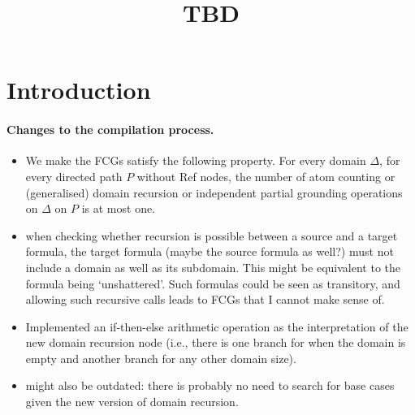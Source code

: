 \documentclass{article}
\title{TBD}
\begin{document}
\maketitle

\begin{abstract}
\end{abstract}

\section{Introduction}


\paragraph{Changes to the compilation process.}
\begin{itemize}
  \item We make the FCGs satisfy the following property. For every domain
        $\Delta$, for every directed path $P$ without Ref nodes, the number of
        atom counting or (generalised) domain recursion or independent partial
        grounding operations on $\Delta$ on $P$ is at most one.
  \item when checking whether recursion is possible between a source and a
        target formula, the target formula (maybe the source formula as well?)
        must not include a domain as well as its subdomain. This might be
        equivalent to the formula being `unshattered'. Such formulas could be
        seen as transitory, and allowing such recursive calls leads to FCGs that
        I cannot make sense of.
  \item Implemented an if-then-else arithmetic operation as the interpretation
        of the new domain recursion node (i.e., there is one branch for when the
        domain is empty and another branch for any other domain size).
  \item {} might also be outdated: there is
        probably no need to search for base cases given the new version of
        domain recursion.
\end{itemize}
\end{document}

